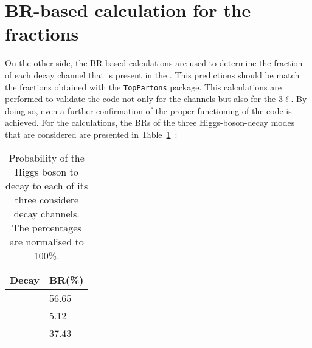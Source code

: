 
 


\section{BR-based calculation for the \tHq fractions}
\label{sec:ChaptH:Sig:truth:Calculations}
 On the other side, the BR-based calculations are used to determine the fraction of each decay channel that is present in the \dileptau. This predictions should be match the fractions obtained with the \texttt{TopPartons} package. This 
calculations are performed to validate the code
not only for the \dileptau channels but also for the $3\ell$.  By doing so, even a further confirmation
of the proper functioning of the code is achieved. 
For the calculations, the BRs of the three Higgs-boson-decay modes that are considered are presented in 
Table~\ref{tab:Appendix:TopPartons:Decay:H}~\cite{Workman:2022ynf}:
\begin{table}[h]
\centering
\begin{tabular}{ll}
\toprule
Decay    	& BR(\%) \\ \midrule
\Htautau 	& 56.65 \\
\HWW 	& 5.12  \\
\HZZ     	& 37.43 \\ \bottomrule
\end{tabular}
\caption{Probability of the Higgs boson to decay to each of its three considere decay channels. The percentages are normalised to 100\%.}
\label{tab:Appendix:TopPartons:Decay:H}
\end{table}



